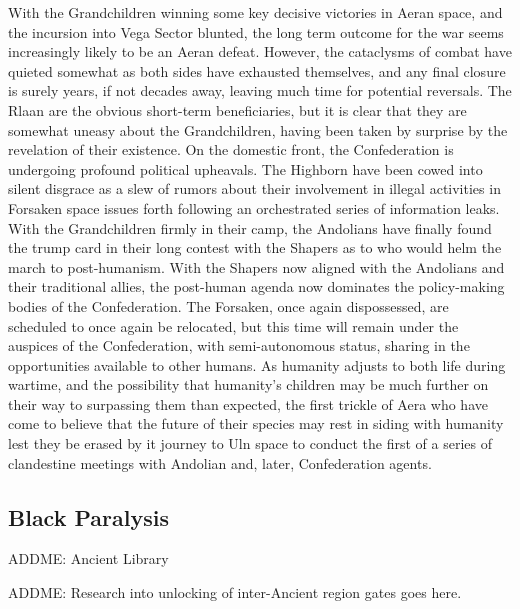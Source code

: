 With the Grandchildren winning some key decisive victories in Aeran
space, and the incursion into Vega Sector blunted, the long term
outcome for the war seems increasingly likely to be an Aeran
defeat. However, the cataclysms of combat have quieted somewhat as
both sides have exhausted themselves, and any final closure is surely
years, if not decades away, leaving much time for potential
reversals. The Rlaan are the obvious short-term beneficiaries, but it
is clear that they are somewhat uneasy about the Grandchildren, having
been taken by surprise by the revelation of their existence. On the
domestic front, the Confederation is undergoing profound political
upheavals. The Highborn have been cowed into silent disgrace as a slew
of rumors about their involvement in illegal activities in Forsaken
space issues forth following an orchestrated series of information
leaks. With the Grandchildren firmly in their camp, the Andolians have
finally found the trump card in their long contest with the Shapers as
to who would helm the march to post-humanism. With the Shapers now
aligned with the Andolians and their traditional allies, the
post-human agenda now dominates the policy-making bodies of the
Confederation. The Forsaken, once again dispossessed, are scheduled to
once again be relocated, but this time will remain under the auspices
of the Confederation, with semi-autonomous status, sharing in the
opportunities available to other humans. As humanity adjusts to both
life during wartime, and the possibility that humanity's children may
be much further on their way to surpassing them than expected, the
first trickle of Aera who have come to believe that the future of
their species may rest in siding with humanity lest they be erased by
it journey to Uln space to conduct the first of a series of
clandestine meetings with Andolian and, later, Confederation agents.

\subsection{Black Paralysis}

ADDME: Ancient Library

ADDME: Research into unlocking of inter-Ancient region gates goes here.

